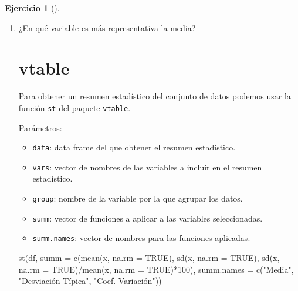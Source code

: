 \documentclass[
  a4paper,
]{scrreport}
\newenvironment{Shaded}{\begin{snugshade}}{\end{snugshade}}
\newcommand{\AttributeTok}[1]{\textcolor[rgb]{0.40,0.45,0.13}{#1}}
\newcommand{\FunctionTok}[1]{\textcolor[rgb]{0.28,0.35,0.67}{#1}}
\newcommand{\NormalTok}[1]{\textcolor[rgb]{0.00,0.23,0.31}{#1}}
\newcommand{\StringTok}[1]{\textcolor[rgb]{0.13,0.47,0.30}{#1}}
\providecommand{\tightlist}{%
  \setlength{\itemsep}{0pt}\setlength{\parskip}{0pt}}\usepackage{longtable,booktabs,array}
\theoremstyle{definition}
\newtheorem{exercise}{Ejercicio}[chapter]
\theoremstyle{remark}
\begin{document}
\begin{exercise}[]
\begin{enumerate}
\begin{tcolorbox}
  \end{tcolorbox}
\item
  ¿En qué variable es más representativa la media?

  \begin{tcolorbox}[enhanced jigsaw, colframe=quarto-callout-tip-color-frame, toprule=.15mm, bottomtitle=1mm, breakable, opacitybacktitle=0.6, toptitle=1mm, colback=white, bottomrule=.15mm, title=\textcolor{quarto-callout-tip-color}{\faLightbulb}\hspace{0.5em}{Solución}, arc=.35mm, left=2mm, titlerule=0mm, rightrule=.15mm, coltitle=black, leftrule=.75mm, opacityback=0, colbacktitle=quarto-callout-tip-color!10!white]

  \section{vtable}

  Para obtener un resumen estadístico del conjunto de datos podemos usar
  la función \texttt{st} del paquete
  \href{https://cran.r-project.org/web/packages/vtable/vignettes/sumtable.html}{\texttt{vtable}}.

  Parámetros:

  \begin{itemize}
  \tightlist
  \item
    \texttt{data}: data frame del que obtener el resumen estadístico.
  \item
    \texttt{vars}: vector de nombres de las variables a incluir en el
    resumen estadístico.
  \item
    \texttt{group}: nombre de la variable por la que agrupar los datos.
  \item
    \texttt{summ}: vector de funciones a aplicar a las variables
    seleccionadas.
  \item
    \texttt{summ.names}: vector de nombres para las funciones aplicadas.
  \end{itemize}

\begin{Shaded}
\begin{Highlighting}[]
\FunctionTok{st}\NormalTok{(df, }\AttributeTok{summ =} \FunctionTok{c}\NormalTok{(}\StringTok{\textquotesingle{}mean(x, na.rm = TRUE)\textquotesingle{}}\NormalTok{, }\StringTok{\textquotesingle{}sd(x, na.rm = TRUE)\textquotesingle{}}\NormalTok{, }\StringTok{\textquotesingle{}sd(x, na.rm = TRUE)/mean(x, na.rm = TRUE)*100\textquotesingle{}}\NormalTok{),}
\AttributeTok{summ.names =} \FunctionTok{c}\NormalTok{(}\StringTok{"Media"}\NormalTok{, }\StringTok{"Desviación Típica"}\NormalTok{, }\StringTok{"Coef. Variación"}\NormalTok{))}
\end{Highlighting}
\end{Shaded}


\end{tcolorbox}
\end{enumerate}
\end{exercise}
\end{document}
